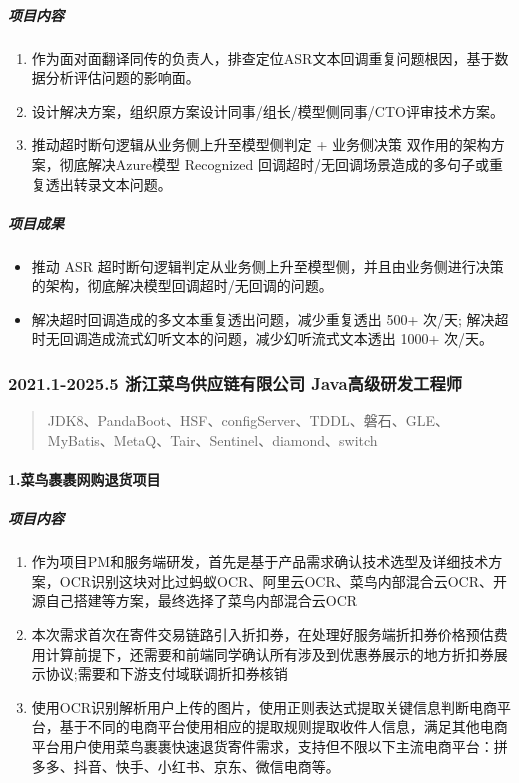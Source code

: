 \subparagraph{项目内容}\label{ux9879ux76eeux5185ux5bb9-2}

\begin{enumerate}
\def\labelenumi{\arabic{enumi}.}
\tightlist
\item
  作为面对面翻译同传的负责人，排查定位ASR文本回调重复问题根因，基于数据分析评估问题的影响面。
\item
  设计解决方案，组织原方案设计同事/组长/模型侧同事/CTO评审技术方案。
\item
  推动超时断句逻辑从业务侧上升至模型侧判定 + 业务侧决策
  双作用的架构方案，彻底解决Azure模型 Recognized
  回调超时/无回调场景造成的多句子或重复透出转录文本问题。
\end{enumerate}

\subparagraph{项目成果}\label{ux9879ux76eeux6210ux679c-2}

\begin{itemize}
\tightlist
\item
  推动 ASR
  超时断句逻辑判定从业务侧上升至模型侧，并且由业务侧进行决策的架构，彻底解决模型回调超时/无回调的问题。
\item
  解决超时回调造成的多文本重复透出问题，减少重复透出 500+ 次/天;
  解决超时无回调造成流式幻听文本的问题，减少幻听流式文本透出 1000+
  次/天。
\end{itemize}

\subsubsection{2021.1-2025.5 \textbar{} 浙江菜鸟供应链有限公司
\textbar{}
Java高级研发工程师}\label{ux6d59ux6c5fux83dcux9e1fux4f9bux5e94ux94feux6709ux9650ux516cux53f8-javaux9ad8ux7ea7ux7814ux53d1ux5de5ux7a0bux5e08}

\begin{quote}
JDK8、PandaBoot、HSF、configServer、TDDL、磐石、GLE、MyBatis、MetaQ、Tair、Sentinel、diamond、switch
\end{quote}

\paragraph{1.菜鸟裹裹网购退货项目}\label{ux83dcux9e1fux88f9ux88f9ux7f51ux8d2dux9000ux8d27ux9879ux76ee}

\subparagraph{项目内容}\label{ux9879ux76eeux5185ux5bb9-3}

\begin{enumerate}
\def\labelenumi{\arabic{enumi}.}
\tightlist
\item
  作为项目PM和服务端研发，首先是基于产品需求确认技术选型及详细技术方案，OCR识别这块对比过蚂蚁OCR、阿里云OCR、菜鸟内部混合云OCR、开源自己搭建等方案，最终选择了菜鸟内部混合云OCR
\item
  本次需求首次在寄件交易链路引入折扣券，在处理好服务端折扣券价格预估费用计算前提下，还需要和前端同学确认所有涉及到优惠券展示的地方折扣券展示协议;需要和下游支付域联调折扣券核销
\item
  使用OCR识别解析用户上传的图片，使用正则表达式提取关键信息判断电商平台，基于不同的电商平台使用相应的提取规则提取收件人信息，满足其他电商平台用户使用菜鸟裹裹快速退货寄件需求，支持但不限以下主流电商平台：拼多多、抖音、快手、小红书、京东、微信电商等。
\end{enumerate}

